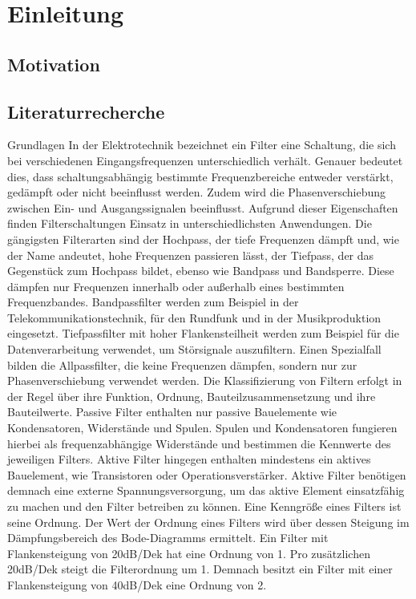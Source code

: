 \clearpage
\section{Einleitung}

\subsection{Motivation}

\subsection{Literaturrecherche}
Grundlagen
In der Elektrotechnik bezeichnet ein Filter eine Schaltung, die sich bei verschiedenen Eingangsfrequenzen unterschiedlich verhält. Genauer bedeutet dies, dass schaltungsabhängig bestimmte Frequenzbereiche entweder verstärkt, gedämpft oder nicht beeinflusst werden. Zudem wird die Phasenverschiebung zwischen Ein- und Ausgangssignalen beeinflusst. Aufgrund dieser Eigenschaften finden Filterschaltungen Einsatz in unterschiedlichsten Anwendungen. Die gängigsten Filterarten sind der Hochpass, der tiefe Frequenzen dämpft und, wie der Name andeutet, hohe Frequenzen passieren lässt, der Tiefpass, der das Gegenstück zum Hochpass bildet, ebenso wie Bandpass und Bandsperre. Diese dämpfen nur Frequenzen innerhalb oder außerhalb eines bestimmten Frequenzbandes.
Bandpassfilter werden zum Beispiel in der Telekommunikationstechnik, für den Rundfunk und in der Musikproduktion eingesetzt. Tiefpassfilter mit hoher Flankensteilheit werden zum Beispiel für die Datenverarbeitung verwendet, um Störsignale auszufiltern. Einen Spezialfall bilden die Allpassfilter, die keine Frequenzen dämpfen, sondern nur zur Phasenverschiebung verwendet werden.
Die Klassifizierung von Filtern erfolgt in der Regel über ihre Funktion, Ordnung, Bauteilzusammensetzung und ihre Bauteilwerte. Passive Filter enthalten nur passive Bauelemente wie Kondensatoren, Widerstände und Spulen. Spulen und Kondensatoren fungieren hierbei als frequenzabhängige Widerstände und bestimmen die Kennwerte des jeweiligen Filters. Aktive Filter hingegen enthalten mindestens ein aktives Bauelement, wie Transistoren oder Operationsverstärker. Aktive Filter benötigen demnach eine externe Spannungsversorgung, um das aktive Element einsatzfähig zu machen und den Filter betreiben zu können.
Eine Kenngröße eines Filters ist seine Ordnung. Der Wert der Ordnung eines Filters wird über dessen Steigung im Dämpfungsbereich des Bode-Diagramms ermittelt. Ein Filter mit Flankensteigung von 20dB/Dek hat eine Ordnung von 1. Pro zusätzlichen 20dB/Dek steigt die Filterordnung um 1. Demnach besitzt ein Filter mit einer Flankensteigung von 40dB/Dek eine Ordnung von 2. 
